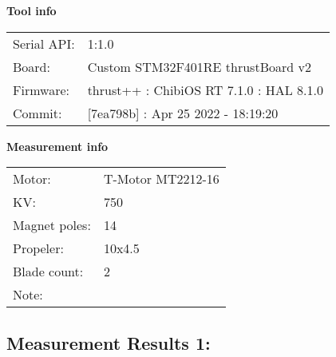 \documentclass[10pt]{article}
\begin{document}
\noindent
{\large \bf Tool info}
\vspace{3mm}

\noindent
\begin{tabular}{ll}
Serial API:  & 1:1.0\\ 
Board:       & Custom STM32F401RE thrustBoard v2\\ 
Firmware:    & thrust++ : ChibiOS RT 7.1.0 : HAL 8.1.0\\ 
Commit:      & [7ea798b] : Apr 25 2022 - 18:19:20
\end{tabular}
\vspace{3mm}

\noindent
{\large \bf Measurement info}
\vspace{3mm}

\noindent
\begin{tabular}{ll}
Motor:        & T-Motor MT2212-16\\ 
KV:           & 750\\ 
Magnet poles: & 14\\ 
Propeler:     & 10x4.5\\ 
Blade count:  & 2\\ 
Note:         & 
\end{tabular}

\vspace{3mm}


\subsection*{\large \bf Measurement Results 1:}
\end{document}

